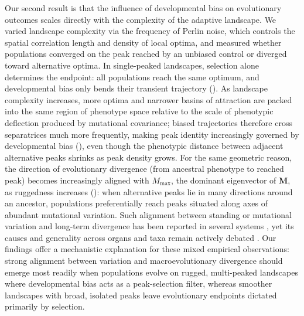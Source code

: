 Our second result is that the influence of developmental bias on evolutionary outcomes scales directly with the complexity of the adaptive landscape.
We varied landscape complexity via the frequency of Perlin noise, which controls the spatial correlation length and density of local optima, and measured whether populations converged on the peak reached by an unbiased control or diverged toward alternative optima.
In single-peaked landscapes, selection alone determines the endpoint: all populations reach the same optimum, and developmental bias only bends their transient trajectory ().
As landscape complexity increases, more optima and narrower basins of attraction are packed into the same region of phenotype space relative to the scale of phenotypic deflection produced by mutational covariance; biased trajectories therefore cross separatrices much more frequently, making peak identity increasingly governed by developmental bias (), even though the phenotypic distance between adjacent alternative peaks shrinks as peak density grows.
For the same geometric reason, the direction of evolutionary divergence (from ancestral phenotype to reached peak) becomes increasingly aligned with $M_{\max}$, the dominant eigenvector of $\mathbf{M}$, as ruggedness increases (): when alternative peaks lie in many directions around an ancestor, populations preferentially reach peaks situated along axes of abundant mutational variation.
Such alignment between standing or mutational variation and long-term divergence has been reported in several systems \parencite{Houle2017-ph, rohner2023developmental, holstad2024evolvability}, yet its causes and generality across organs and taxa remain actively debated \parencite{rohner2025developmental, cai2026persistent, branden2026apparent}.
Our findings offer a mechanistic explanation for these mixed empirical observations: strong alignment between variation and macroevolutionary divergence should emerge most readily when populations evolve on rugged, multi-peaked landscapes where developmental bias acts as a peak-selection filter, whereas smoother landscapes with broad, isolated peaks leave evolutionary endpoints dictated primarily by selection.

